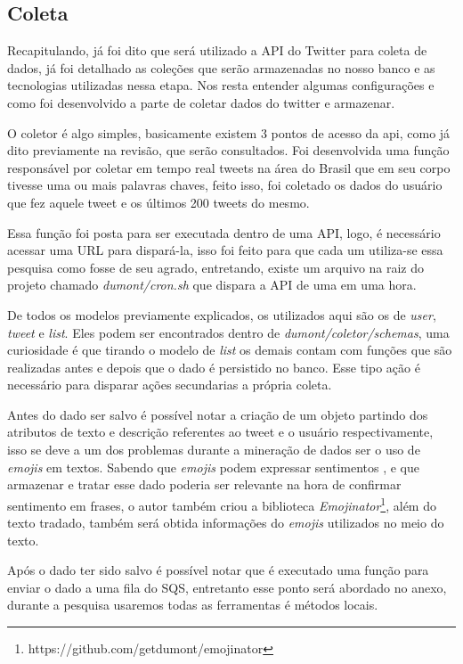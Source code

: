 \subsection{Coleta}
Recapitulando, já foi dito que será utilizado a API do Twitter para coleta de dados, já foi detalhado as coleções que serão armazenadas no nosso banco e as tecnologias utilizadas nessa etapa. Nos resta entender algumas configurações e como foi desenvolvido a parte de coletar dados do twitter e armazenar.

O coletor é algo simples, basicamente existem 3 pontos de acesso da api, como já dito previamente na revisão, que serão consultados. Foi desenvolvida uma função responsável por coletar em tempo real tweets na área do Brasil que em seu corpo tivesse uma ou mais palavras chaves, feito isso, foi coletado os dados do usuário que fez aquele tweet e os últimos 200 tweets do mesmo.

Essa função foi posta para ser executada dentro de uma API, logo, é necessário acessar uma URL para dispará-la, isso foi feito para que cada um utiliza-se essa pesquisa como fosse de seu agrado, entretando, existe um arquivo na raiz do projeto chamado \textit{dumont/cron.sh} que dispara a API de uma em uma hora.

De todos os modelos previamente explicados, os utilizados aqui são os de \textit{user}, \textit{tweet} e \textit{list}. Eles podem ser encontrados dentro de \textit{dumont/coletor/schemas}, uma curiosidade é que tirando o modelo de \textit{list} os demais contam com funções que são realizadas antes e depois que o dado é persistido no banco. Esse tipo ação é necessário para disparar ações secundarias a própria coleta.

Antes do dado ser salvo é possível notar a criação de um objeto partindo dos atributos de texto e descrição referentes ao tweet e o usuário respectivamente, isso se deve a um dos problemas durante a mineração de dados ser o uso de \textit{emojis} em textos. Sabendo que \textit{emojis} podem expressar sentimentos \cite{novak2015sentiment}, e que armazenar e tratar esse dado poderia ser relevante na hora de confirmar sentimento em frases, o autor também criou a biblioteca \textit{Emojinator}\footnote{https://github.com/getdumont/emojinator}, além do texto tradado, também será obtida informações do \textit{emojis} utilizados no meio do texto.

Após o dado ter sido salvo é possível notar que é executado uma função para enviar o dado a uma fila do SQS, entretanto esse ponto será abordado no anexo, durante a pesquisa usaremos todas as ferramentas é métodos locais.

